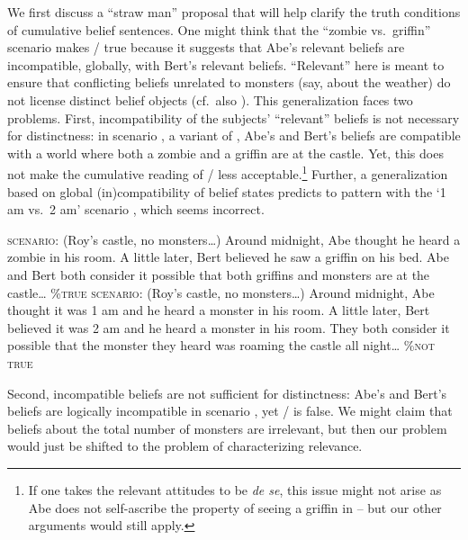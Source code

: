 \documentclass[output=paper]{langscibook}
\begin{document}
We first discuss a ``straw man'' proposal that will help clarify the truth conditions of cumulative belief sentences. One might think that the ``zombie vs.~griffin'' scenario  makes / true because it suggests that Abe's relevant beliefs are incompatible, globally, with Bert's relevant beliefs. ``Relevant'' here is meant to ensure that conflicting beliefs unrelated to monsters (say, about the weather) do not license distinct belief objects (cf.~also \citealt{Pasternak:2018a}). This generalization faces two problems. First, incompatibility of the subjects' ``relevant'' beliefs is not necessary for distinctness: in scenario , a variant of , Abe's and Bert's beliefs are  compatible with a world where both a zombie and a griffin are at the castle. Yet, this does not make the cumulative reading of / less acceptable.\footnote{If one takes the relevant attitudes to be \textit{de se}, this issue might not arise as Abe does not self-ascribe the property of seeing a griffin in  -- but our other arguments would still apply.} Further, a generalization based on global (in)compatibility of belief states predicts  to pattern with the `1 am vs.~2 am' scenario , which seems incorrect.

\eanoraggedright
\eanoraggedright \label{sch-has:ex:20} \textsc{scenario:} (Roy's castle, no monsters\ldots) Around midnight, Abe thought he heard a zombie in his room. A little later, Bert believed he saw a griffin on his bed. Abe and Bert both consider it possible that both griffins and monsters are at the castle\ldots \hfill {} \%\textsc{true} 
\ex \label{sch-has:ex:21} \textsc{scenario:} (Roy's castle, no monsters\ldots) Around midnight, Abe thought it was 1 am and he heard a monster in his room. A little later, Bert believed it was 2 am and he heard a monster in his room. They both consider it possible that the monster they heard was roaming the castle all night\ldots \hfill {} \%\textsc{not true} \z\z

\noindent Second, incompatible beliefs are not sufficient for distinctness:  Abe's and Bert's beliefs are logically incompatible  in scenario , yet / is false. We might claim that beliefs about the total number of monsters are irrelevant, but then our problem would just be shifted to the problem of characterizing relevance.
\end{document}
